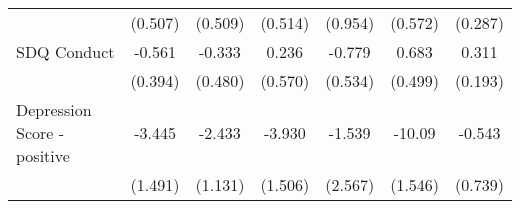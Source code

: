 {\begin{tabular}{l*{6}{c}}
            &     (0.507)         &     (0.509)         &     (0.514)         &     (0.954)         &     (0.572)         &     (0.287)         \\
\addlinespace
SDQ Conduct &      -0.561         &      -0.333         &       0.236         &      -0.779         &       0.683         &       0.311         \\
            &     (0.394)         &     (0.480)         &     (0.570)         &     (0.534)         &     (0.499)         &     (0.193)         \\
\addlinespace
Depression Score - positive&      -3.445\sym{*}  &      -2.433\sym{*}  &      -3.930\sym{**} &      -1.539         &      -10.09\sym{***}&      -0.543         \\
            &     (1.491)         &     (1.131)         &     (1.506)         &     (2.567)         &     (1.546)         &     (0.739)         \\
\bottomrule
\end{tabular}
}
